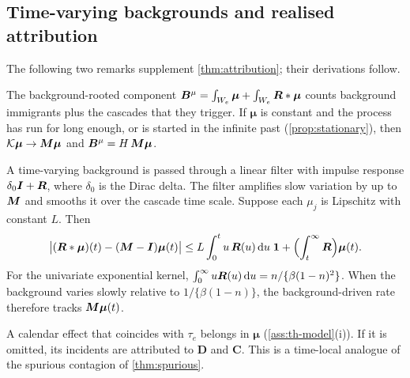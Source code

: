 \subsection{Time-varying backgrounds and realised attribution}\label{app:at-remarks}

The following two remarks supplement \cref{thm:attribution}; their derivations follow.

\begin{remark}\label{rem:at-background}
The background-rooted component $\bm B^\mu=\int_{W_e}\bm\mu+\int_{W_e}\bm{R}*\bm\mu$
counts background immigrants plus the cascades that they trigger. If $\bm\mu$ is
constant and the process has run for long enough, or is started in the infinite past
(\cref{prop:stationary}), then $\mathcal K\bm\mu\to\bm{M}\bm\mu$ and
$\bm B^\mu=H\,\bm{M}\bm\mu$.

A time-varying background is passed through a linear filter with impulse response
$\delta_0\bm{I}+\bm{R}$, where $\delta_0$ is the Dirac delta. The filter amplifies slow variation by up to $\bm{M}$ and smooths
it over the cascade time scale. Suppose each $\mu_j$ is Lipschitz with constant $L$.
Then
\[
\bigl|(\bm{R}*\bm\mu)(t)-(\bm{M}-\bm{I})\bm\mu(t)\bigr|
\le L\int_0^t u\,\bm{R}(u)\,\mathrm{d} u\;\mathbf 1+\Bigl(\int_t^\infty\bm{R}\Bigr)\bm\mu(t).
\]
For the univariate exponential kernel, $\int_0^\infty u\bm{R}(u)\,\mathrm{d} u=n/\{\beta(1-n)^2\}$.
When the background varies slowly relative to $1/\{\beta(1-n)\}$, the
background-driven rate therefore tracks $\bm{M}\bm\mu(t)$.

A calendar effect that coincides with $\tau_e$ belongs in $\bm\mu$
(\cref{ass:th-model}(i)). If it is omitted, its incidents are attributed to $\bm D$ and
$\bm C$. This is a time-local analogue of the spurious contagion of
\cref{thm:spurious}.
\end{remark}

